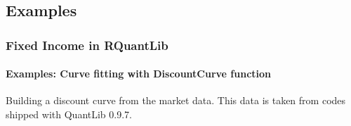 \documentclass[compress]{beamer}
\begin{document}
\subsection{Examples}
\begin{frame}[shrink]
	\frametitle{Fixed Income in RQuantLib}
	\framesubtitle{Examples: Curve fitting with DiscountCurve function}
Building a discount curve from the market data. This data is taken from codes shipped with QuantLib 0.9.7. 
\vskip15pt
\pagecolor{bgcolor}
\noindent
\ttfamily
{}\hlsym{$<${-}\ }\hlstd{}\hlstd{}\hlsym{(}\hlsym{=}\hlstd{}\hlstd{}\hlsym{(}\hlstd{}\hlstd{}\hlsym{),}\hspace*{\fill}\\
\hlstd{}\hlstd{\ \ \ \ \ \ \ \ \ \ \ \ \ \ \ }\hlsym{=}\hlstd{}\hlstd{}\hlsym{(}\hlstd{}\hlstd{}\hlsym{),}\hspace*{\fill}\\
\hlstd{}\hlstd{\ \ \ \ \ \ \ \ \ \ \ \ \ \ \ }\hlsym{=}\hlstd{}\hlstd{}\hlsym{,}\hspace*{\fill}\\
\hlstd{}\hlstd{\ \ \ \ \ \ \ \ \ \ \ \ \ \ \ }\hlsym{=}\hlstd{}\hlstd{}\hlsym{)}\hspace*{\fill}\\
\hlsym{$<${-}\ }\hlstd{}\hlstd{}\hlsym{(}\hlsym{=}\hlstd{}\hlstd{}\hlsym{,\ }\hlsym{=}\hlstd{}\hlstd{}\hlsym{,}\hspace*{\fill}\\
\hlstd{}\hlstd{\ \ \ \ \ \ \ \ \ \ \ \ \ \ \ \ \ }\hlsym{=}\hlstd{}\hlstd{}\hlsym{,\ }\hlsym{=}\hlstd{}\hlstd{}\hlsym{,}\hspace*{\fill}\\
\hlstd{}\hlstd{\ \ \ \ \ \ \ \ \ \ \ \ \ \ \ \ \ }\hlsym{=}\hlstd{}\hlstd{}\hlsym{,\ }\hlsym{=}\hlstd{}\hlstd{}\hlsym{,}\hspace*{\fill}\\
\hlstd{}\hlstd{\ \ \ \ \ \ \ \ \ \ \ \ \ \ \ \ \ }\hlsym{=}\hlstd{}\hlstd{}\hlsym{,\ }\hlsym{=}\hlstd{}\hlstd{}\hlsym{,}\hspace*{\fill}\\
\hlstd{}\hlstd{\ \ \ \ \ \ \ \ \ \ \ \ \ \ \ \ \ }\hlsym{=}\hlstd{}\hlstd{}\hlsym{,\ }\hlsym{=}\hlstd{}\hlstd{}\hlsym{,}\hspace*{\fill}\\

\end{frame}
\end{document}
